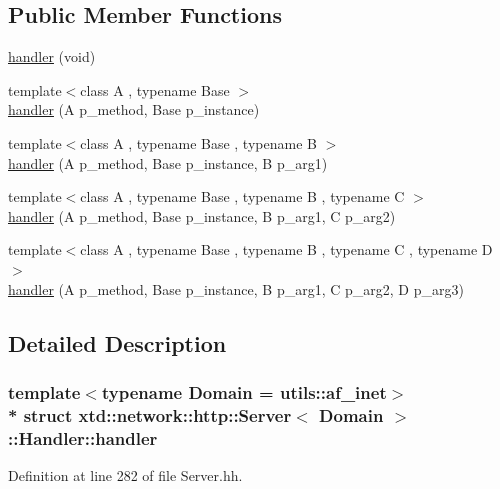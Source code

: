 \subsection*{Public Member Functions}
\begin{DoxyCompactItemize}
\item 
\hyperlink{structxtd_1_1network_1_1http_1_1Server_1_1Handler_1_1handler_a590cb56ee70081b73e98b47c0d50b3f1}{handler} (void)
\item 
{\footnotesize template$<$class A , typename Base $>$ }\\\hyperlink{structxtd_1_1network_1_1http_1_1Server_1_1Handler_1_1handler_a8fe309868dbefb2fbbdda593782728f6}{handler} (A p\+\_\+method, Base p\+\_\+instance)
\item 
{\footnotesize template$<$class A , typename Base , typename B $>$ }\\\hyperlink{structxtd_1_1network_1_1http_1_1Server_1_1Handler_1_1handler_ab6f310afe2dcb6c474906f42986bce4d}{handler} (A p\+\_\+method, Base p\+\_\+instance, B p\+\_\+arg1)
\item 
{\footnotesize template$<$class A , typename Base , typename B , typename C $>$ }\\\hyperlink{structxtd_1_1network_1_1http_1_1Server_1_1Handler_1_1handler_a64993bf20fa797e2e174adeb0bcd520d}{handler} (A p\+\_\+method, Base p\+\_\+instance, B p\+\_\+arg1, C p\+\_\+arg2)
\item 
{\footnotesize template$<$class A , typename Base , typename B , typename C , typename D $>$ }\\\hyperlink{structxtd_1_1network_1_1http_1_1Server_1_1Handler_1_1handler_af7e711a4e11ebc9fb1c5399f030ce778}{handler} (A p\+\_\+method, Base p\+\_\+instance, B p\+\_\+arg1, C p\+\_\+arg2, D p\+\_\+arg3)
\end{DoxyCompactItemize}


\subsection{Detailed Description}
\subsubsection*{template$<$typename Domain = utils\+::af\+\_\+inet$>$\\*
struct xtd\+::network\+::http\+::\+Server$<$ Domain $>$\+::\+Handler\+::handler}



Definition at line 282 of file Server.\+hh.



